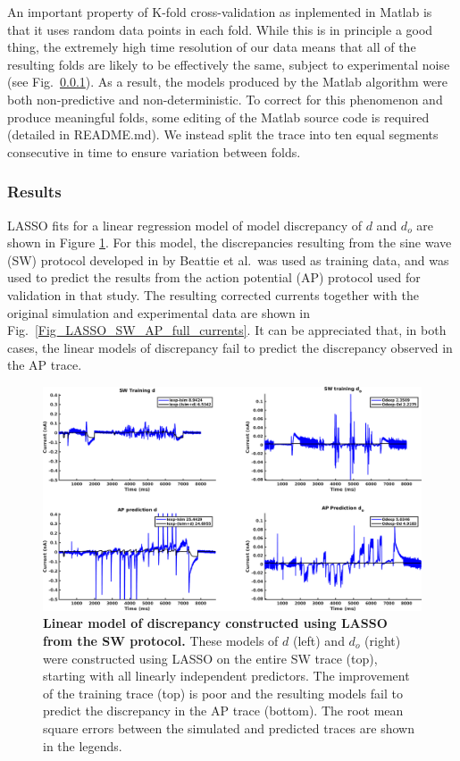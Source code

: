 \documentclass[11pt,a4paper,oneside]{article}
\begin{document}
An important property of K-fold cross-validation as inplemented in Matlab is that it uses random data points in each fold. While this is in principle a good thing, the extremely high time resolution of our data means that all of the resulting folds are likely to  be effectively the same, subject to experimental noise (see Fig.~\ref{}). As a result, the models produced by the Matlab algorithm were both non-predictive and non-deterministic. To correct for this phenomenon and produce meaningful folds, some editing of the Matlab source code is required (detailed in README.md). We instead split the trace into ten equal segments consecutive in time to ensure variation between folds.

\subsubsection{Results}

LASSO fits for a linear regression model of model discrepancy of $d$ and $d_o$ are shown in Figure \ref{Fig_LASSO_SW_AP_full_discrepancy}. For this model, the discrepancies resulting from the sine wave (SW) protocol developed in by Beattie et al.~was used as training data, and was used to predict the results from the action potential (AP) protocol used for validation in that study. The resulting corrected currents together with the original simulation and experimental data are shown in Fig.~\ref{Fig_LASSO_SW_AP_full_currents}. It can be appreciated that, in both cases, the linear models of discrepancy fail to predict the discrepancy observed in the AP trace.

\begin{figure}[t]
\begin{center}
\includegraphics[scale=0.42]{Figures/LASSO_SW_AP_full_discrepancy.png}
\caption{\textbf{Linear model of discrepancy constructed using LASSO from the SW protocol.} These models of $d$ (left) and $d_o$ (right) were constructed using LASSO on the entire SW trace (top), starting with all linearly independent predictors. The improvement of the training trace (top) is poor and the resulting models fail to predict the discrepancy in the AP trace (bottom). The root mean square errors between the simulated and predicted traces are shown in the legends. } 
\label{Fig_LASSO_SW_AP_full_discrepancy}
\end{center}
\end{figure}
\end{document}

